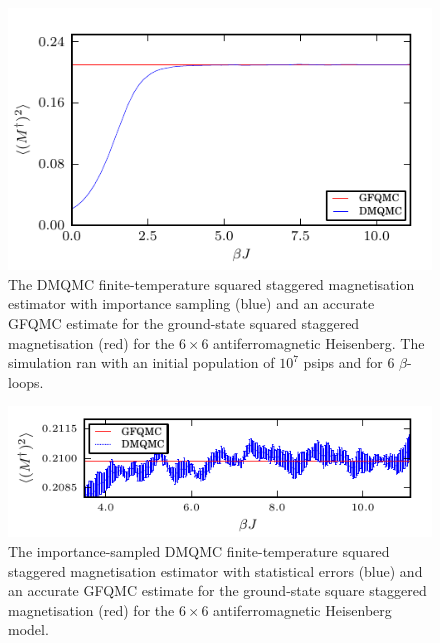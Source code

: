 \begin{figure}[H]
\begin{center}
\includegraphics[width =1\textwidth]{6x6_10000000_6_stag_mag.pdf}
\caption[The DMQMC finite-temperature squared staggered magnetisation estimator with importance sampling for the $6\times6$ antiferromagnetic Heisenberg model.]{The DMQMC finite-temperature squared staggered magnetisation estimator with importance sampling (blue) and an accurate GFQMC estimate for the ground-state squared staggered magnetisation (red) for the $6\times6$ antiferromagnetic Heisenberg. The simulation ran with an initial population of $10^7$ psips and for $6$ $\beta$-loops.}
\label{fig:6x6_10000000_6_stag_mag}
\end{center}
\end{figure}
\begin{figure}[H]
\begin{center}
\includegraphics[width =1\textwidth]{6x6_10000000_6_stag_mag_subplot.pdf}
\caption[The importance-sampled DMQMC finite-temperature squared staggered magnetisation estimator with statistical errors or the $6\times6$ antiferromagnetic Heisenberg model.]{The importance-sampled DMQMC finite-temperature squared staggered magnetisation estimator with statistical errors (blue) and an accurate GFQMC estimate for the ground-state square staggered magnetisation (red) for the $6\times6$ antiferromagnetic Heisenberg model. }
\label{fig:6x6_10000000_6_stag_mag_subplot}
\end{center}
\end{figure}

